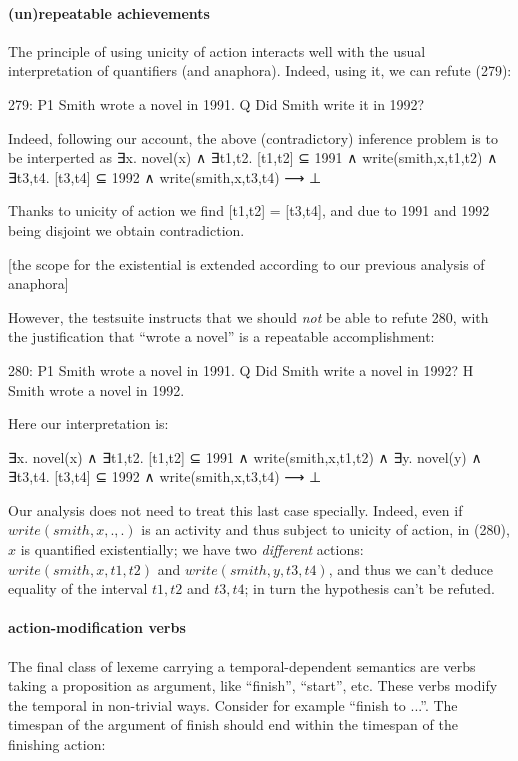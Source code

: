 \documentclass[a4paper,11pt]{article}
\begin{document}
\paragraph{(un)repeatable achievements}
The principle of using unicity of action interacts well with the usual interpretation of quantifiers (and anaphora).
Indeed, using it, we can refute (279):

279:
P1	Smith wrote a novel in 1991.
Q 	Did Smith write it in 1992?

Indeed, following our account, the above (contradictory) inference problem is to be
interperted as
∃x. novel(x) ∧
∃t1,t2. [t1,t2] ⊆ 1991 ∧ write(smith,x,t1,t2) ∧
∃t3,t4. [t3,t4] ⊆ 1992 ∧ write(smith,x,t3,t4)
⟶ ⊥

Thanks to unicity of action we find [t1,t2] = [t3,t4], and due to 1991
and 1992 being disjoint we obtain contradiction.

[the scope
for the existential is extended according to our previous analysis of
anaphora]

However, the testsuite instructs that we should \emph{not} be able to refute
280, with the justification that ``wrote a novel'' is a repeatable
accomplishment:

280:
P1	Smith wrote a novel in 1991.
Q 	Did Smith write a novel in 1992?
H 	Smith wrote a novel in 1992.

Here our interpretation is:

∃x. novel(x) ∧
∃t1,t2. [t1,t2] ⊆ 1991 ∧ write(smith,x,t1,t2) ∧
∃y. novel(y) ∧
∃t3,t4. [t3,t4] ⊆ 1992 ∧ write(smith,x,t3,t4)
⟶ ⊥

Our analysis does not need to treat this last case specially. Indeed,
even if $write(smith,x,.,.)$ is an activity and thus subject to
unicity of action, in (280), $x$ is quantified existentially; we have
two \emph{different} actions: $write(smith,x,t1,t2)$ and
$write(smith,y,t3,t4)$, and thus we can't deduce equality of the
interval $t1,t2$ and $t3,t4$; in turn the hypothesis can't be refuted.


\paragraph{action-modification verbs}

The final class of lexeme carrying a temporal-dependent semantics are
verbs taking a proposition as argument, like ``finish'', ``start'',
etc. These verbs modify the temporal in non-trivial ways. Consider for
example ``finish to ...''. The timespan of the argument of finish
should end within the timespan of the finishing action:
\end{document}
